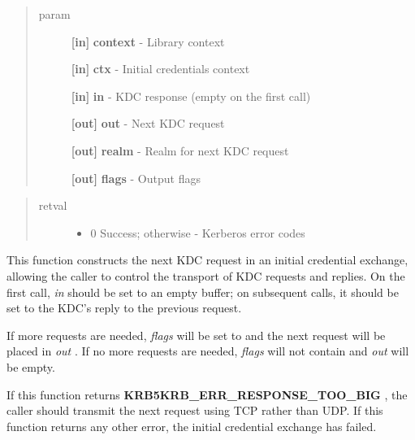 \documentclass[letterpaper,10pt,english]{sphinxmanual}
\begin{document}
\begin{quote}\begin{description}
\item[{param}] \leavevmode
\textbf{{[}in{]}} \textbf{context} - Library context

\textbf{{[}in{]}} \textbf{ctx} - Initial credentials context

\textbf{{[}in{]}} \textbf{in} - KDC response (empty on the first call)

\textbf{{[}out{]}} \textbf{out} - Next KDC request

\textbf{{[}out{]}} \textbf{realm} - Realm for next KDC request

\textbf{{[}out{]}} \textbf{flags} - Output flags

\end{description}\end{quote}
\begin{quote}\begin{description}
\item[{retval}] \leavevmode\begin{itemize}
\item {} 
0   Success; otherwise - Kerberos error codes

\end{itemize}

\end{description}\end{quote}

This function constructs the next KDC request in an initial credential exchange, allowing the caller to control the transport of KDC requests and replies. On the first call, \emph{in} should be set to an empty buffer; on subsequent calls, it should be set to the KDC's reply to the previous request.

If more requests are needed, \emph{flags} will be set to {\hyperref[appdev/refs/macros/KRB5_INIT_CREDS_STEP_FLAG_CONTINUE:KRB5_INIT_CREDS_STEP_FLAG_CONTINUE]{}} and the next request will be placed in \emph{out} . If no more requests are needed, \emph{flags} will not contain {\hyperref[appdev/refs/macros/KRB5_INIT_CREDS_STEP_FLAG_CONTINUE:KRB5_INIT_CREDS_STEP_FLAG_CONTINUE]{}} and \emph{out} will be empty.

If this function returns \textbf{KRB5KRB\_ERR\_RESPONSE\_TOO\_BIG} , the caller should transmit the next request using TCP rather than UDP. If this function returns any other error, the initial credential exchange has failed.
\end{document}
